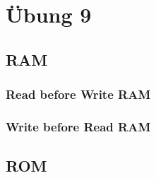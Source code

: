\section{Übung 9}
\subsection{RAM}
\subsubsection{Read before Write RAM}

\subsubsection{Write before Read RAM}

\subsection{ROM}

